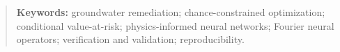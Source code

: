 \begin{abstract}
\vspace{0.6em}
\noindent\textbf{Keywords:} groundwater remediation; chance-constrained
optimization; conditional value-at-risk; physics-informed neural networks;
Fourier neural operators; verification and validation; reproducibility.
\end{abstract}
